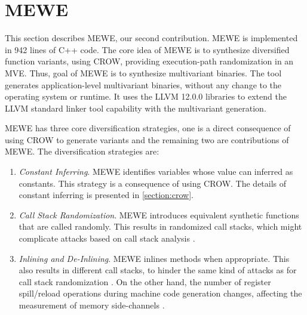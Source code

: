\section{MEWE}
\label{section:mewe}

\newcommand{\tool}{MEWE\xspace}
\newcommand{\repourl}{TODO}
This section describes MEWE, our second contribution. 
MEWE is implemented in 942 lines of C++ code.
The core idea of \tool is to synthesize diversified function variants, using CROW, providing execution-path randomization in an MVE. Thus, goal of \tool is to synthesize multivariant  \wasm binaries. %
The tool generates application-level multivariant binaries, without any change to the operating system or \wasm runtime.
It uses the LLVM 12.0.0 libraries to extend the LLVM standard linker tool capability with the multivariant generation.

MEWE has three core diversification strategies, one is a direct consequence of using CROW to generate variants and the remaining two are contributions of MEWE. The diversification strategies are:
\begin{enumerate}
    \item \emph{Constant Inferring}. \tool identifies variables whose value can inferred as constants. This strategy is a consequence of using CROW. The details of constant inferring is presented in \autoref{section:crow}.

    \item \emph{Call Stack Randomization}. \tool introduces equivalent synthetic functions that are called randomly. This results in randomized call stacks, which might complicate attacks based on call stack analysis \cite{liljestrand2021pacstack}. 

    \item \emph{Inlining and De-Inlining}. \tool inlines methods when appropriate. This also results in different call stacks, to hinder the same kind of attacks as for call stack randomization \cite{liljestrand2021pacstack}. On the other hand, the number of register spill/reload operations during machine code generation changes, affecting the measurement of memory side-channels \cite{rane2015raccoon}. 
    

\end{enumerate}


